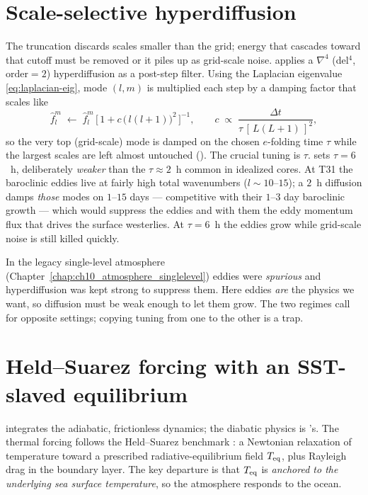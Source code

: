 \section{Scale-selective hyperdiffusion}

The truncation discards scales smaller than the grid; energy that cascades toward
that cutoff must be removed or it piles up as grid-scale noise. \model{} applies a
$\nabla^4$ (del$^4$, $\text{order}=2$) hyperdiffusion as a post-step filter. Using
the Laplacian eigenvalue \eqref{eq:laplacian-eig}, mode $(l,m)$ is multiplied each
step by a damping factor that scales like
\begin{equation}
  \hat f_l^m \;\longleftarrow\; \hat f_l^m \,\Big[\,1 + c\,\big(\,l(l+1)\big)^{2}\,\Big]^{-1},
  \qquad
  c \;\propto\; \frac{\Delta t}{\tau\,[\,L(L+1)\,]^{2}} ,
\end{equation}
so the very top (grid-scale) mode is damped on the chosen $e$-folding time $\tau$
while the largest scales are left almost untouched
().
The crucial tuning is $\tau$. \model{} sets $\tau = 6$~h, deliberately
\emph{weaker} than the $\tau\approx 2$~h common in idealized cores. At T31 the
baroclinic eddies live at fairly high total wavenumbers ($l\sim 10$--$15$); a
$2$~h diffusion damps \emph{those} modes on $1$--$15$ days --- competitive with
their $1$--$3$ day baroclinic growth --- which would suppress the eddies and with
them the eddy momentum flux that drives the surface westerlies. At $\tau = 6$~h
the eddies grow while grid-scale noise is still killed quickly.

\begin{remark}
In the legacy single-level atmosphere
(Chapter~\ref{chap:ch10_atmosphere_singlelevel}) eddies were \emph{spurious} and
hyperdiffusion was kept strong to suppress them. Here eddies \emph{are} the
physics we want, so diffusion must be weak enough to let them grow. The two
regimes call for opposite settings; copying tuning from one to the other is a
trap.
\end{remark}

\section{Held--Suarez forcing with an SST-slaved equilibrium}\label{sec:ch09forcing}

\dino{} integrates the adiabatic, frictionless dynamics; the diabatic physics is
\model{}'s. The thermal forcing follows the Held--Suarez benchmark
\citep{heldsuarez1994}: a Newtonian relaxation of temperature toward a prescribed
radiative-equilibrium field $T_{\mathrm{eq}}$, plus Rayleigh drag in the boundary layer. The
key \model{} departure is that $T_{\mathrm{eq}}$ is \emph{anchored to the underlying sea
surface temperature}, so the atmosphere responds to the ocean.

